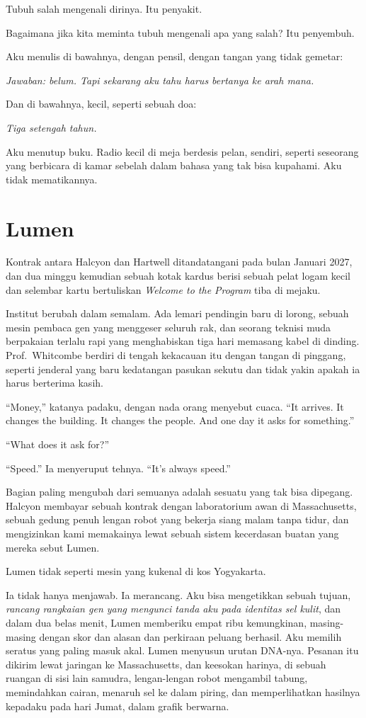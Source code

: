 \documentclass[11pt,twoside,openany]{book}
\makeatletter
\newcommand{\scenebreak}{\par\vspace{0.9em}{\centering\textsc{*\hspace{0.7em}*\hspace{0.7em}*}\par}\vspace{0.9em}\@afterindentfalse\@afterheading}
\makeatother
\begin{document}
Tubuh salah mengenali dirinya. Itu penyakit.

Bagaimana jika kita meminta tubuh mengenali apa yang salah? Itu penyembuh.

Aku menulis di bawahnya, dengan pensil, dengan tangan yang tidak gemetar:

\emph{Jawaban: belum. Tapi sekarang aku tahu harus bertanya ke arah mana.}

Dan di bawahnya, kecil, seperti sebuah doa:

\emph{Tiga setengah tahun.}

Aku menutup buku. Radio kecil di meja berdesis pelan, sendiri, seperti seseorang yang berbicara di kamar sebelah dalam bahasa yang tak bisa kupahami. Aku tidak mematikannya.

\chapter{Lumen}
Kontrak antara Halcyon dan Hartwell ditandatangani pada bulan Januari 2027, dan dua minggu kemudian sebuah kotak kardus berisi sebuah pelat logam kecil dan selembar kartu bertuliskan \emph{Welcome to the Program} tiba di mejaku.

Institut berubah dalam semalam. Ada lemari pendingin baru di lorong, sebuah mesin pembaca gen yang menggeser seluruh rak, dan seorang teknisi muda berpakaian terlalu rapi yang menghabiskan tiga hari memasang kabel di dinding. Prof.~Whitcombe berdiri di tengah kekacauan itu dengan tangan di pinggang, seperti jenderal yang baru kedatangan pasukan sekutu dan tidak yakin apakah ia harus berterima kasih.

``Money,'' katanya padaku, dengan nada orang menyebut cuaca. ``It arrives. It changes the building. It changes the people. And one day it asks for something.''

``What does it ask for?''

``Speed.'' Ia menyeruput tehnya. ``It's always speed.''

Bagian paling mengubah dari semuanya adalah sesuatu yang tak bisa dipegang. Halcyon membayar sebuah kontrak dengan laboratorium awan di Massachusetts, sebuah gedung penuh lengan robot yang bekerja siang malam tanpa tidur, dan mengizinkan kami memakainya lewat sebuah sistem kecerdasan buatan yang mereka sebut Lumen.

\scenebreak
Lumen tidak seperti mesin yang kukenal di kos Yogyakarta.

Ia tidak hanya menjawab. Ia merancang. Aku bisa mengetikkan sebuah tujuan, \emph{rancang rangkaian gen yang mengunci tanda aku pada identitas sel kulit}, dan dalam dua belas menit, Lumen memberiku empat ribu kemungkinan, masing-masing dengan skor dan alasan dan perkiraan peluang berhasil. Aku memilih seratus yang paling masuk akal. Lumen menyusun urutan DNA-nya. Pesanan itu dikirim lewat jaringan ke Massachusetts, dan keesokan harinya, di sebuah ruangan di sisi lain samudra, lengan-lengan robot mengambil tabung, memindahkan cairan, menaruh sel ke dalam piring, dan memperlihatkan hasilnya kepadaku pada hari Jumat, dalam grafik berwarna.
\end{document}
